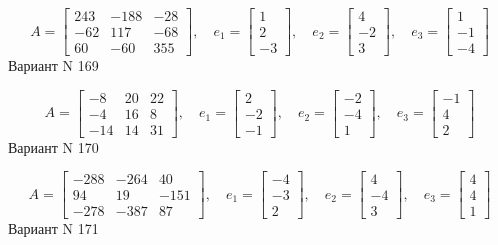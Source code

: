\documentclass[11pt]{report}
\begin{document}
$$A = \left[\begin{matrix}243 & -188 & -28\\-62 & 117 & -68\\60 & -60 & 355\end{matrix}\right],\quad e_1 = \left[\begin{matrix}1\\2\\-3\end{matrix}\right],\quad e_2 = \left[\begin{matrix}4\\-2\\3\end{matrix}\right],\quad e_3 = \left[\begin{matrix}1\\-1\\-4\end{matrix}\right]$$Вариант N 169

$$A = \left[\begin{matrix}-8 & 20 & 22\\-4 & 16 & 8\\-14 & 14 & 31\end{matrix}\right],\quad e_1 = \left[\begin{matrix}2\\-2\\-1\end{matrix}\right],\quad e_2 = \left[\begin{matrix}-2\\-4\\1\end{matrix}\right],\quad e_3 = \left[\begin{matrix}-1\\4\\2\end{matrix}\right]$$Вариант N 170

$$A = \left[\begin{matrix}-288 & -264 & 40\\94 & 19 & -151\\-278 & -387 & 87\end{matrix}\right],\quad e_1 = \left[\begin{matrix}-4\\-3\\2\end{matrix}\right],\quad e_2 = \left[\begin{matrix}4\\-4\\3\end{matrix}\right],\quad e_3 = \left[\begin{matrix}4\\4\\1\end{matrix}\right]$$Вариант N 171
\end{document}
